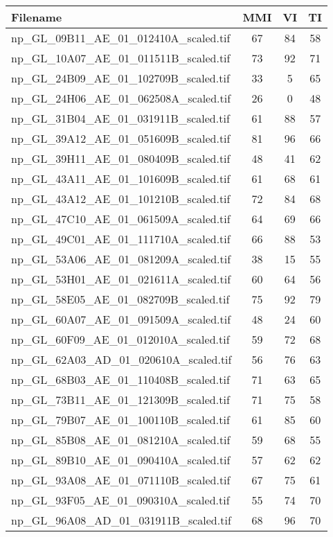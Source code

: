 \begin{tabular}{lccc}
\hline
 Filename                             & MMI & VI & TI \\ \hline \hline
 np\_GL\_09B11\_AE\_01\_012410A\_scaled.tif & 67  & 84 & 58 \\
 np\_GL\_10A07\_AE\_01\_011511B\_scaled.tif & 73  & 92 & 71 \\
 np\_GL\_24B09\_AE\_01\_102709B\_scaled.tif & 33  & 5  & 65 \\
 np\_GL\_24H06\_AE\_01\_062508A\_scaled.tif & 26  & 0  & 48 \\
 np\_GL\_31B04\_AE\_01\_031911B\_scaled.tif & 61  & 88 & 57 \\
 np\_GL\_39A12\_AE\_01\_051609B\_scaled.tif & 81  & 96 & 66 \\
 np\_GL\_39H11\_AE\_01\_080409B\_scaled.tif & 48  & 41 & 62 \\
 np\_GL\_43A11\_AE\_01\_101609B\_scaled.tif & 61  & 68 & 61 \\
 np\_GL\_43A12\_AE\_01\_101210B\_scaled.tif & 72  & 84 & 68 \\
 np\_GL\_47C10\_AE\_01\_061509A\_scaled.tif & 64  & 69 & 66 \\
 np\_GL\_49C01\_AE\_01\_111710A\_scaled.tif & 66  & 88 & 53 \\
 np\_GL\_53A06\_AE\_01\_081209A\_scaled.tif & 38  & 15 & 55 \\
 np\_GL\_53H01\_AE\_01\_021611A\_scaled.tif & 60  & 64 & 56 \\
 np\_GL\_58E05\_AE\_01\_082709B\_scaled.tif & 75  & 92 & 79 \\
 np\_GL\_60A07\_AE\_01\_091509A\_scaled.tif & 48  & 24 & 60 \\
 np\_GL\_60F09\_AE\_01\_012010A\_scaled.tif & 59  & 72 & 68 \\
 np\_GL\_62A03\_AD\_01\_020610A\_scaled.tif & 56  & 76 & 63 \\
 np\_GL\_68B03\_AE\_01\_110408B\_scaled.tif & 71  & 63 & 65 \\
 np\_GL\_73B11\_AE\_01\_121309B\_scaled.tif & 71  & 75 & 58 \\
 np\_GL\_79B07\_AE\_01\_100110B\_scaled.tif & 61  & 85 & 60 \\
 np\_GL\_85B08\_AE\_01\_081210A\_scaled.tif & 59  & 68 & 55 \\
 np\_GL\_89B10\_AE\_01\_090410A\_scaled.tif & 57  & 62 & 62 \\
 np\_GL\_93A08\_AE\_01\_071110B\_scaled.tif & 67  & 75 & 61 \\
 np\_GL\_93F05\_AE\_01\_090310A\_scaled.tif & 55  & 74 & 70 \\
 np\_GL\_96A08\_AD\_01\_031911B\_scaled.tif & 68  & 96 & 70 \\
\hline
\end{tabular}